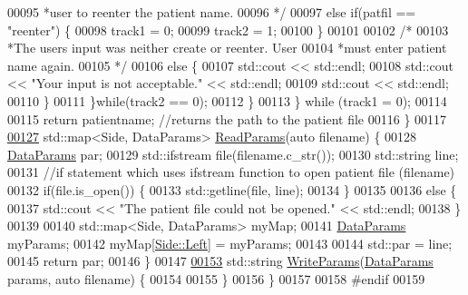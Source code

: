 \begin{DoxyCode}
00095 \textcolor{comment}{                    *user to reenter the patient name.}
00096 \textcolor{comment}{                    */}
00097                     \textcolor{keywordflow}{else} \textcolor{keywordflow}{if}(patfil == \textcolor{stringliteral}{"reenter"}) \{
00098                         track1 = 0;
00099                         track2 = 1;
00100                     \}
00101 
00102                     \textcolor{comment}{/*}
00103 \textcolor{comment}{                    *The users input was neither create or reenter. User}
00104 \textcolor{comment}{                    *must enter patient name again.}
00105 \textcolor{comment}{                    */}
00106                     \textcolor{keywordflow}{else} \{
00107                         std::cout << std::endl;
00108                         std::cout << \textcolor{stringliteral}{"Your input is not acceptable."} << std::endl;
00109                         std::cout << std::endl;
00110                     \}
00111                 \}\textcolor{keywordflow}{while}(track2 == 0);
00112             \}
00113         \} \textcolor{keywordflow}{while} (track1 = 0);
00114 
00115         \textcolor{keywordflow}{return} patientname; \textcolor{comment}{//returns the path to the patient file}
00116     \}
00117 
\hypertarget{fileio_8hpp_source_l00127}{}\hyperlink{namespacevaso_afc1435dcb9c37b3ccde589738b26c909}{00127}     std::map<Side, DataParams> \hyperlink{namespacevaso_afc1435dcb9c37b3ccde589738b26c909}{ReadParams}(\textcolor{keyword}{auto} filename) \{
00128         \hyperlink{structDataParams}{DataParams} par;
00129         std::ifstream file(filename.c\_str());
00130         std::string line;
00131         \textcolor{comment}{//if statement which uses ifstream function to open patient file (filename)}
00132         \textcolor{keywordflow}{if}(file.is\_open()) \{
00133             std::getline(file, line);
00134         \}
00135 
00136         \textcolor{keywordflow}{else} \{
00137             std::cout << \textcolor{stringliteral}{"The patient file could not be opened."} << std::endl;
00138         \}
00139 
00140         std::map<Side, DataParams> myMap;
00141         \hyperlink{structDataParams}{DataParams} myParams;
00142         myMap[\hyperlink{namespacevaso_a77c5d9704657d49d456f691ddd8abf7ca945d5e233cf7d6240f6b783b36a374ff}{Side::Left}] = myParams;
00143 
00144         std::par = line;
00145         \textcolor{keywordflow}{return} par;
00146     \}
00147 
\hypertarget{fileio_8hpp_source_l00153}{}\hyperlink{namespacevaso_ad8543c0caabf3836b4a93a78e0d487d1}{00153}     std::string \hyperlink{namespacevaso_ad8543c0caabf3836b4a93a78e0d487d1}{WriteParams}(\hyperlink{structDataParams}{DataParams} params, \textcolor{keyword}{auto} filename) \{
00154 
00155     \}
00156 \}
00157 
00158 \textcolor{preprocessor}{#endif}
00159 
\end{DoxyCode}
